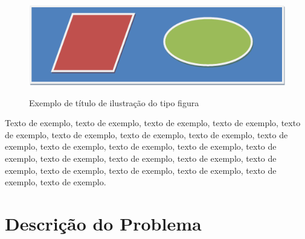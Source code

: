 \documentclass[
	12pt,				%
	oneside,			%
	a4paper,			%
	english,			%
	brazil				%
	]{abntex2ppgsi}
\begin{document}
% 
%
%
%
%
\begin{figure}[H]%
	\centering
 	  \caption{Exemplo de título de ilustração do tipo figura}
		\includegraphics{figuras/figura-exemplo.png}
	\label{fig:figura-exemplo1}
\end{figure}

Texto de exemplo, texto de exemplo, texto de exemplo, texto de exemplo, texto de exemplo, texto de exemplo, texto de exemplo, texto de exemplo, texto de exemplo, texto de exemplo, texto de exemplo, texto de exemplo, texto de exemplo, texto de exemplo, texto de exemplo, texto de exemplo, texto de exemplo, texto de exemplo, texto de exemplo, texto de exemplo, texto de exemplo, texto de exemplo.

\section{Descrição do Problema}
 
\end{document}

